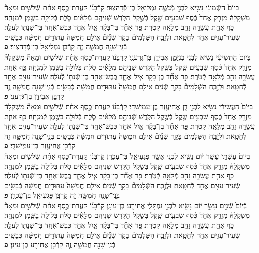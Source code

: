 \documentclass[twoside, openany, parskip=half, 11pt]{book}
\begin{document}
\begin{sometimes}
\begin{footnotesize}
\begin{multicols}{2}
בַּיּוֹם֙ הַשְּֿׁמִינִ֔י נָשִׂ֖יא לִבְנֵ֣י מְֿנַשֶּׁ֑ה גַּמְלִיאֵ֖ל בֶּן־פְּֿֿדָהצֽוּר׃ קָרְֿבָּנ֜וֹ קַֽעֲרַת־כֶּ֣סֶף אַחַ֗ת שְֿׁלֹשִׁ֣ים וּמֵאָה֘ מִשְׁקָלָהּ֒ מִזְרָ֤ק אֶחָד֙ כֶּ֔סֶף שִׁבְעִ֥ים שֶׁ֖קֶל בְּֿשֶׁ֣קֶל הַקֹּ֑דֶשׁ שְֿׁנֵיהֶ֣ם מְֿלֵאִ֗ים סֹ֛לֶת בְּֿלוּלָ֥ה בַשֶּׁ֖מֶן לְֿמִנְחָֽה׃ כַּ֥ף אַחַ֛ת עֲשָׂרָ֥ה זָהָ֖ב מְֿלֵאָ֥ה קְֿטֹֽרֶת׃  פַּ֣ר אֶחָ֞ד בֶּן־בָּקָ֗ר אַ֧יִל אֶחָ֛ד כֶּֽבֶשׂ־אֶחָ֥ד בֶּן־שְֿׁנָת֖וֹ לְֿעֹלָֽה׃ שְֿׂעִיר־עִזִּ֥ים אֶחָ֖ד לְֿחַטָּֽאת׃ וּלְזֶ֣בַֽח הַשְּֿׁלָמִים֘ בָּקָ֣ר שְֿׁנַ֒יִם֒ אֵילִ֤ם חֲמִשָּׁה֙ עַתּוּדִ֣ים חֲמִשָּׁ֔ה כְּֿבָשִׂ֥ים בְּֿנֵֽי־שָׁנָ֖ה חֲמִשָּׁ֑ה זֶ֛ה קָרְֿבַּ֥ן גַּמְלִיאֵ֖ל בֶּן־פְּֿֿדָהצֽוּר׃ \textbf{פ} \\
 בַּיּוֹם֙ הַתְּֿשִׁיעִ֔י נָשִׂ֖יא לִבְנֵ֣י בִנְיָמִ֑ן אֲבִידָ֖ן בֶּן־גִּדְעֹנִֽי׃ קָרְֿבָּנ֜וֹ קַֽעֲרַת־כֶּ֣סֶף אַחַ֗ת שְֿׁלֹשִׁ֣ים וּמֵאָה֘ מִשְׁקָלָהּ֒ מִזְרָ֤ק אֶחָד֙ כֶּ֔סֶף שִׁבְעִ֥ים שֶׁ֖קֶל בְּֿשֶׁ֣קֶל הַקֹּ֑דֶשׁ שְֿׁנֵיהֶ֣ם מְֿלֵאִ֗ים סֹ֛לֶת בְּֿלוּלָ֥ה בַשֶּׁ֖מֶן לְֿמִנְחָֽה׃ כַּ֥ף אַחַ֛ת עֲשָׂרָ֥ה זָהָ֖ב מְֿלֵאָ֥ה קְֿטֹֽרֶת׃ פַּ֣ר אֶחָ֞ד בֶּן־בָּקָ֗ר אַ֧יִל אֶחָ֛ד כֶּֽבֶשׂ־אֶחָ֥ד בֶּן־שְֿׁנָת֖וֹ לְֿעֹלָֽה׃ שְֿׂעִיר־עִזִּ֥ים אֶחָ֖ד לְֿחַטָּֽאת׃ וּלְזֶ֣בַֽח הַשְּֿׁלָמִים֘ בָּקָ֣ר שְֿׁנַ֒יִם֒ אֵילִ֤ם חֲמִשָּׁה֙ עַתּוּדִ֣ים חֲמִשָּׁ֔ה כְּֿבָשִׂ֥ים בְּֿנֵֽי־שָׁנָ֖ה חֲמִשָּׁ֑ה זֶ֛ה קָרְֿבַּ֥ן אֲבִידָ֖ן בֶּן־גִּדְעֹנִֽי׃ \textbf{פ} \\
בַּיּוֹם֙ הָֽעֲשִׂירִ֔י נָשִׂ֖יא לִבְנֵ֣י דָ֑ן אֲחִיעֶ֖זֶר בֶּן־עַמִּֽישַׁדָּֽי׃ קָרְֿבָּנ֜וֹ קַֽעֲרַת־כֶּ֣סֶף אַחַ֗ת שְֿׁלֹשִׁ֣ים וּמֵאָה֘ מִשְׁקָלָהּ֒ מִזְרָ֤ק אֶחָד֙ כֶּ֔סֶף שִׁבְעִ֥ים שֶׁ֖קֶל בְּֿשֶׁ֣קֶל הַקֹּ֑דֶשׁ שְֿׁנֵיהֶ֣ם מְֿלֵאִ֗ים סֹ֛לֶת בְּֿלוּלָ֥ה בַשֶּׁ֖מֶן לְֿמִנְחָֽה׃ כַּ֥ף אַחַ֛ת עֲשָׂרָ֥ה זָהָ֖ב מְֿלֵאָ֥ה קְֿטֹֽרֶת׃ פַּ֣ר אֶחָ֞ד בֶּן־בָּקָ֗ר אַ֧יִל אֶחָ֛ד כֶּֽבֶשׂ־אֶחָ֥ד בֶּן־שְֿׁנָת֖וֹ לְֿעֹלָֽה׃ שְֿׂעִיר־עִזִּ֥ים אֶחָ֖ד לְֿחַטָּֽאת׃ וּלְזֶ֣בַֽח הַשְּֿׁלָמִים֘ בָּקָ֣ר שְֿׁנַ֒יִם֒ אֵילִ֤ם חֲמִשָּׁה֙ עַתּוּדִ֣ים חֲמִשָּׁ֔ה כְּֿבָשִׂ֥ים בְּֿנֵֽי־שָׁנָ֖ה חֲמִשָּׁ֑ה זֶ֛ה קָרְֿבַּ֥ן אֲחִיעֶ֖זֶר בֶּן־עַמִּֽישַׁדָּֽי׃ \textbf{פ} \\
בְּֿיוֹם֙ עַשְׁתֵּ֣י עָשָׂ֣ר י֔וֹם נָשִׂ֖יא לִבְנֵ֣י אָשֵׁ֑ר פַּגְעִיאֵ֖ל בֶּן־עָכְֿרָֽן׃ קָרְֿבָּנ֜וֹ קַֽעֲרַת־כֶּ֣סֶף אַחַ֗ת שְֿׁלֹשִׁ֣ים וּמֵאָה֘ מִשְׁקָלָהּ֒ מִזְרָ֤ק אֶחָד֙ כֶּ֔סֶף שִׁבְעִ֥ים שֶׁ֖קֶל בְּֿשֶׁ֣קֶל הַקֹּ֑דֶשׁ שְֿׁנֵיהֶ֣ם מְֿלֵאִ֗ים סֹ֛לֶת בְּֿלוּלָ֥ה בַשֶּׁ֖מֶן לְֿמִנְחָֽה׃ כַּ֥ף אַחַ֛ת עֲשָׂרָ֥ה זָהָ֖ב מְֿלֵאָ֥ה קְֿטֹֽרֶת׃ פַּ֣ר אֶחָ֞ד בֶּן־בָּקָ֗ר אַ֧יִל אֶחָ֛ד כֶּֽבֶשׂ־אֶחָ֥ד בֶּן־שְֿׁנָת֖וֹ לְֿעֹלָֽה׃ שְֿׂעִיר־עִזִּ֥ים אֶחָ֖ד לְֿחַטָּֽאת׃ וּלְזֶ֣בַֽח הַשְּֿׁלָמִים֘ בָּקָ֣ר שְֿׁנַ֒יִם֒ אֵילִ֤ם חֲמִשָּׁה֙ עַתּוּדִ֣ים חֲמִשָּׁ֔ה כְּֿבָשִׂ֥ים בְּֿנֵֽי־שָׁנָ֖ה חֲמִשָּׁ֑ה זֶ֛ה קָרְֿבַּ֥ן פַּגְעִיאֵ֖ל בֶּן־עָכְֿרָֽן׃ \textbf{פ} \\
בְּֿיוֹם֙ שְֿׁנֵ֣ים עָשָׂ֣ר י֔וֹם נָשִׂ֖יא לִבְנֵ֣י נַפְתָּלִ֑י אֲחִירַ֖ע בֶּן־עֵינָֽן׃ קָרְֿבָּנ֜וֹ קַֽעֲרַת־כֶּ֣סֶף אַחַ֗ת שְֿׁלֹשִׁ֣ים וּמֵאָה֘ מִשְׁקָלָהּ֒ מִזְרָ֤ק אֶחָד֙ כֶּ֔סֶף שִׁבְעִ֥ים שֶׁ֖קֶל בְּֿשֶׁ֣קֶל הַקֹּ֑דֶשׁ שְֿׁנֵיהֶ֣ם מְֿלֵאִ֗ים סֹ֛לֶת בְּֿלוּלָ֥ה בַשֶּׁ֖מֶן לְֿמִנְחָֽה׃ כַּ֥ף אַחַ֛ת עֲשָׂרָ֥ה זָהָ֖ב מְֿלֵאָ֥ה קְֿטֹֽרֶת׃ פַּ֣ר אֶחָ֞ד בֶּן־בָּקָ֗ר אַ֧יִל אֶחָ֛ד כֶּֽבֶשׂ־אֶחָ֥ד בֶּן־שְֿׁנָת֖וֹ לְֿעֹלָֽה׃ שְֿׂעִיר־עִזִּ֥ים אֶחָ֖ד לְֿחַטָּֽאת׃ וּלְזֶ֣בַֽח הַשְּֿׁלָמִים֘ בָּקָ֣ר שְֿׁנַ֒יִם֒ אֵילִ֤ם חֲמִשָּׁה֙ עַתּוּדִ֣ים חֲמִשָּׁ֔ה כְּֿבָשִׂ֥ים בְּֿנֵֽי־שָׁנָ֖ה חֲמִשָּׁ֑ה זֶ֛ה קָרְֿבַּ֥ן אֲחִירַ֖ע בֶּן־עֵינָֽן׃ \textbf{פ} \\

\end{multicols}
\end{footnotesize}
\end{sometimes}
\end{document}
